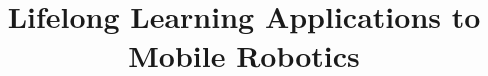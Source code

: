 \documentclass{aamas2016}
\begin{document}


\title{{\color{red} Lifelong Learning Applications to Mobile Robotics} }




%
%
%
%

%

\end{document}
